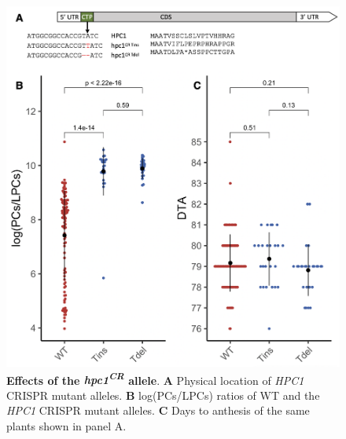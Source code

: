 \documentclass[9pt,twocolumn,twoside,lineno]{biorxiv}
\newcommand{\hpc}{\textit{HPC1}\xspace}
\begin{document}
\begin{figure}[t]
\begin{center}
\includegraphics[width=0.6\paperwidth]{Sup_Figures/Sup_Fig_7.png}
\caption{\textbf{Effects of the \textit{hpc1\textsuperscript{CR}} allele}. \textbf{A} Physical location of \hpc CRISPR mutant alleles. \textbf{B} log(PCs/LPCs) ratios of WT and the \hpc CRISPR mutant alleles. \textbf{C} Days to anthesis of the same plants shown in panel A.   
}
\label{figure:Sup:CRISPR_effect}
\end{center}
\end{figure} 


\clearpage
\end{document}
